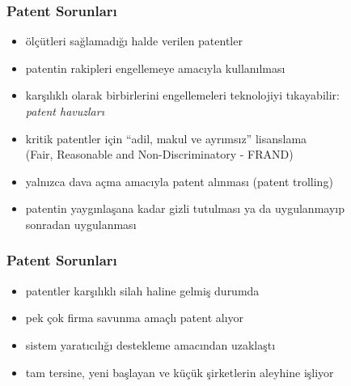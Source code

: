 \documentclass[dvipsnames]{beamer}
\theoremstyle{plain}
\begin{document}
\begin{frame}
  \frametitle{Patent Sorunları}

  \begin{itemize}
    \item ölçütleri sağlamadığı halde verilen patentler

    \medskip
    \item patentin rakipleri engellemeye amacıyla kullanılması
    \item karşılıklı olarak birbirlerini engellemeleri teknolojiyi tıkayabilir:\\
      \emph{patent havuzları}
    \item kritik patentler için ``adil, makul ve ayrımsız'' lisanslama\\
      (Fair, Reasonable and Non-Discriminatory - FRAND)

    \medskip
    \item yalnızca dava açma amacıyla patent alınması (patent trolling)

    \medskip
    \item patentin yaygınlaşana kadar gizli tutulması ya da uygulanmayıp\\
      sonradan uygulanması
  \end{itemize}
\end{frame}

\begin{frame}
  \frametitle{Patent Sorunları}

  \begin{itemize}
    \item patentler karşılıklı silah haline gelmiş durumda
    \item pek çok firma savunma amaçlı patent alıyor

    \medskip
    \item sistem yaratıcılığı destekleme amacından uzaklaştı
    \item tam tersine, yeni başlayan ve küçük şirketlerin aleyhine işliyor
  \end{itemize}
\end{frame}
\end{document}
